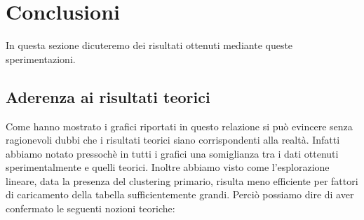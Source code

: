 \documentclass{article}
\begin{document}
\section{Conclusioni}
In questa sezione dicuteremo dei risultati ottenuti mediante queste sperimentazioni.

\subsection{Aderenza ai risultati teorici}
Come hanno mostrato i grafici riportati in questo relazione si può evincere senza ragionevoli dubbi che i risultati teorici siano corrispondenti alla realtà. Infatti abbiamo notato pressochè in tutti i grafici una somiglianza tra i dati ottenuti sperimentalmente e quelli teorici. Inoltre abbiamo visto come l'esplorazione lineare, data la presenza del clustering primario, risulta meno efficiente per fattori di caricamento della tabella sufficientemente grandi. Perciò possiamo dire di aver confermato le seguenti nozioni teoriche:
\end{document}
